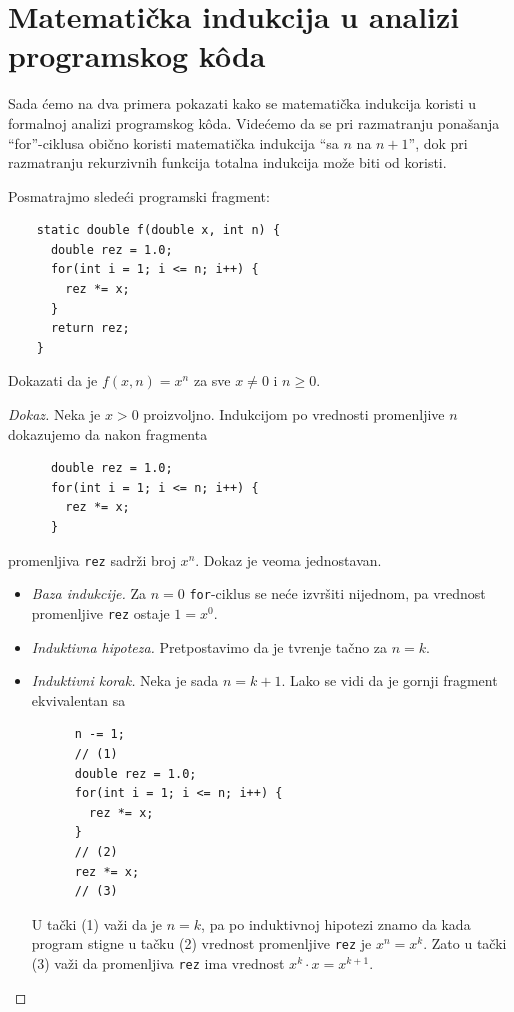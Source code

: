 \section{Matemati\v cka indukcija u analizi programskog k\^oda}

Sada \'cemo na dva primera pokazati kako se matemati\v cka indukcija koristi u formalnoj analizi programskog k\^oda.
Vide\'cemo da se pri razmatranju pona\v sanja \enquote{for}-ciklusa obi\v cno koristi matemati\v cka indukcija \enquote{sa $n$ na $n+1$},
dok pri razmatranju rekurzivnih funkcija totalna indukcija mo\v ze biti od koristi.

\begin{EX}\label{ft05.ex.xn-1}
  Posmatrajmo slede\'ci programski fragment:
{\small
\begin{verbatim}
    static double f(double x, int n) {
      double rez = 1.0;
      for(int i = 1; i <= n; i++) {
        rez *= x;
      }
      return rez;
    }
\end{verbatim}
}
\noindent
  Dokazati da je $f(x, n) = x^n$ za sve $x \ne 0$ i $n \ge 0$.
\end{EX}
\begin{proof}[Dokaz]
  Neka je $x > 0$ proizvoljno. Indukcijom po vrednosti promenljive $n$ dokazujemo da nakon fragmenta
{\small
\begin{verbatim}
      double rez = 1.0;
      for(int i = 1; i <= n; i++) {
        rez *= x;
      }
\end{verbatim}
}
\noindent
promenljiva \verb`rez` sadr\v zi broj $x^n$. Dokaz je veoma jednostavan.
  \begin{itemize}
  \item
    \emph{Baza indukcije.} Za $n = 0$ \verb`for`-ciklus se ne\'ce izvr\v siti nijednom, pa vrednost
    promenljive \verb`rez` ostaje $1 = x^0$.
  \item
    \emph{Induktivna hipoteza.} Pretpostavimo da je tvr\dj enje ta\v cno za $n = k$.
  \item
    \emph{Induktivni korak.} Neka je sada $n = k+1$. Lako se vidi da je gornji fragment ekvivalentan sa
{\small
\begin{verbatim}
      n -= 1;
      // (1)
      double rez = 1.0;
      for(int i = 1; i <= n; i++) {
        rez *= x;
      }
      // (2)
      rez *= x;
      // (3)
\end{verbatim}
}
    \noindent
    U ta\v cki (1) va\v zi da je $n = k$, pa po induktivnoj hipotezi znamo da kada program stigne u ta\v cku (2) vrednost promenljive
    \verb`rez` je $x^n = x^k$. Zato u ta\v cki (3) va\v zi da promenljiva \verb`rez` ima vrednost $x^k \cdot x = x^{k+1}$.~\qedhere
  \end{itemize}
\end{proof}

